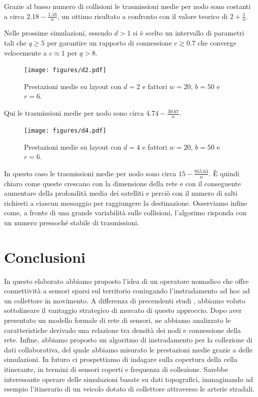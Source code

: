 \documentclass[a4paper,12pt]{article}
\theoremstyle{definition}
\begin{document}
Grazie al basso numero di collisioni le trasmissioni medie per nodo sono costanti a circa $2.18 - \frac{1.16}{n}$, un ottimo risultato a confronto con il valore teorico di $2 + \frac{1}{n}$.

Nelle prossime simulazioni, essendo $d>1$ si è scelto un intervallo di parametri tali che $q \geq 5$ per garantire un rapporto di connessione $c \gtrsim 0.7$ che converge velocemente a $c \approx 1$ per $q > 8$.

\begin{figure}[H]
\centering
\texttt{[image: figures/d2.pdf]}
\caption{Prestazioni medie su layout con $d=2$ e fattori $w=20$, $b=50$ e $r=6$.}
\end{figure}

Qui le trasmissioni medie per nodo sono circa $4.74 - \frac{30.67}{n}$.

\begin{figure}[H]
\centering
\texttt{[image: figures/d4.pdf]}
\caption{Prestazioni medie su layout con $d=4$ e fattori $w=20$, $b=50$ e $r=6$.}
\end{figure}

In questo caso le trasmissioni medie per nodo sono circa $15 - \frac{955.63}{n}$. È quindi chiaro come queste crescano con la dimensione della rete e con il conseguente aumentare della profondità media dei satelliti e perciò con il numero di salti richiesti a ciascun messaggio per raggiungere la destinazione. Osserviamo infine come, a fronte di una grande variabilità sulle collisioni, l'algorimo risponda con un numero pressoché stabile di trasmissioni.

\section{Conclusioni}

In questo elaborato abbiamo proposto l'idea di un operatore nomadico che offre connettività a sensori sparsi sul territorio coniugando l'instradamento ad hoc ad un collettore in movimento. A differenza di precendenti studi \cite{moblife1, moblife2}, abbiamo voluto sottolineare il vantaggio strategico di mercato di questo approccio. Dopo aver presentato un modello formale di rete di sensori, ne abbiamo analizzato le caratteristiche derivado una relazione tra densità dei nodi e connessione della rete. Infine, abbiamo proposto un algoritmo di instradamento per la collezione di dati collaborativa, del quale abbiamo misurato le prestazioni medie grazie a delle simulazioni. In futuro ci prospettiamo di indagare sulla copertura della cella itinerante, in termini di sensori coperti e frequenza di collezione. Sarebbe interessante operare delle simulazioni basate su dati topografici, immaginando ad esempio l'itinerario di un veicolo dotato di collettore attraverso le arterie stradali.
\end{document}
